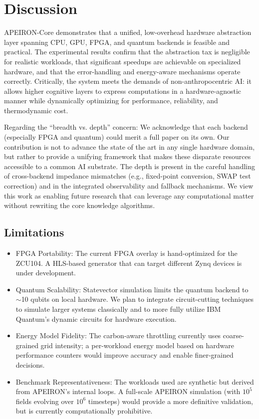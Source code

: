 \newpage
\section{Discussion}

APEIRON-Core demonstrates that a unified, low-overhead hardware abstraction layer spanning CPU, GPU, FPGA, and quantum backends is feasible and practical. The experimental results confirm that the abstraction tax is negligible for realistic workloads, that significant speedups are achievable on specialized hardware, and that the error-handling and energy-aware mechanisms operate correctly. Critically, the system meets the demands of non-anthropocentric AI: it allows higher cognitive layers to express computations in a hardware-agnostic manner while dynamically optimizing for performance, reliability, and thermodynamic cost.

Regarding the ``breadth vs. depth'' concern: We acknowledge that each backend (especially FPGA and quantum) could merit a full paper on its own. Our contribution is not to advance the state of the art in any single hardware domain, but rather to provide a unifying framework that makes these disparate resources accessible to a common AI substrate. The depth is present in the careful handling of cross-backend impedance mismatches (e.g., fixed-point conversion, SWAP test correction) and in the integrated observability and fallback mechanisms. We view this work as enabling future research that can leverage any computational matter without rewriting the core knowledge algorithms.

\subsection{Limitations}

\begin{itemize}
    \item FPGA Portability: The current FPGA overlay is hand-optimized for the ZCU104. A HLS-based generator that can target different Zynq devices is under development.
    \item Quantum Scalability: Statevector simulation limits the quantum backend to $\sim$10 qubits on local hardware. We plan to integrate circuit-cutting techniques to simulate larger systems classically and to more fully utilize IBM Quantum's dynamic circuits for hardware execution.
    \item Energy Model Fidelity: The carbon-aware throttling currently uses coarse-grained grid intensity; a per-workload energy model based on hardware performance counters would improve accuracy and enable finer-grained decisions.
    \item Benchmark Representativeness: The workloads used are synthetic but derived from APEIRON's internal loops. A full-scale APEIRON simulation (with $10^5$ fields evolving over $10^6$ timesteps) would provide a more definitive validation, but is currently computationally prohibitive.
\end{itemize}

